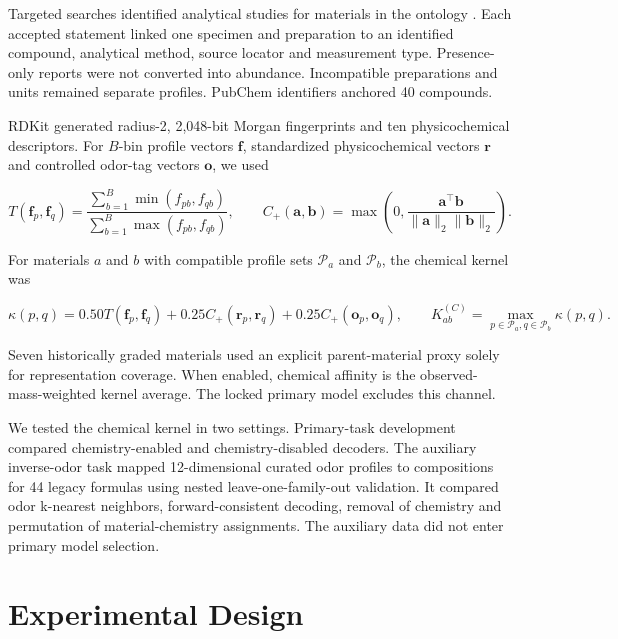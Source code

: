 \documentclass[11pt]{article}
\begin{document}
Targeted searches identified analytical studies for materials in the ontology \cite{ref22,ref23,ref24,ref25,ref26,ref27,ref28,ref29,ref30,ref31,ref32,ref33,ref34,ref35,ref36,ref37,ref38}. Each accepted statement linked one specimen and preparation to an identified compound, analytical method, source locator and measurement type. Presence-only reports were not converted into abundance. Incompatible preparations and units remained separate profiles. PubChem identifiers anchored 40 compounds.

RDKit generated radius-2, 2,048-bit Morgan fingerprints \cite{ref20} and ten physicochemical descriptors. For \(B\)-bin profile vectors \(\mathbf f\), standardized physicochemical vectors \(\mathbf r\) and controlled odor-tag vectors \(\mathbf o\), we used

\begin{equation}
\label{eq:profile-similarities}
T(\mathbf f_p,\mathbf f_q)=\frac{\sum_{b=1}^{B}\min(f_{pb},f_{qb})}{\sum_{b=1}^{B}\max(f_{pb},f_{qb})},\qquad C_+(\mathbf a,\mathbf b)=\max\left(0,\frac{\mathbf a^{\top}\mathbf b}{\|\mathbf a\|_2\|\mathbf b\|_2}\right).
\end{equation}

For materials \(a\) and \(b\) with compatible profile sets \(\mathcal P_a\) and \(\mathcal P_b\), the chemical kernel was

\begin{equation}
\label{eq:chemical-kernel}
\kappa(p,q)=0.50T(\mathbf f_p,\mathbf f_q)+0.25C_+(\mathbf r_p,\mathbf r_q)+0.25C_+(\mathbf o_p,\mathbf o_q),\qquad K^{(C)}_{ab}=\max_{p\in\mathcal P_a,q\in\mathcal P_b}\kappa(p,q).
\end{equation}

Seven historically graded materials used an explicit parent-material proxy solely for representation coverage. When enabled, chemical affinity is the observed-mass-weighted kernel average. The locked primary model excludes this channel.

We tested the chemical kernel in two settings. Primary-task development compared chemistry-enabled and chemistry-disabled decoders. The auxiliary inverse-odor task mapped 12-dimensional curated odor profiles to compositions for 44 legacy formulas using nested leave-one-family-out validation. It compared odor k-nearest neighbors, forward-consistent decoding, removal of chemistry and permutation of material-chemistry assignments. The auxiliary data did not enter primary model selection.

\section{Experimental Design}
\end{document}
